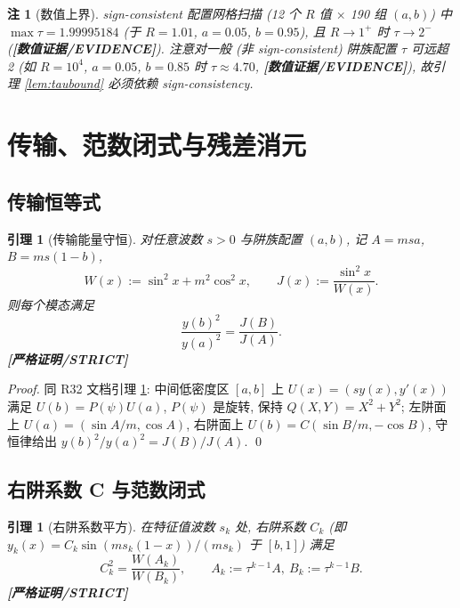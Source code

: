 \documentclass[UTF8]{ctexart}
\newtheorem{lemma}[theorem]{引理}
\newtheorem{remark}[theorem]{注}
\newcommand{\STRICT}{\textbf{[严格证明/STRICT]}}
\newcommand{\EVID}{\textbf{[数值证据/EVIDENCE]}}
\begin{document}
\begin{remark}[数值上界]\label{rem:taunum}
	sign-consistent 配置网格扫描 (12 个 $R$ 值 $\times$ 190 组 $(a,b)$) 中
	$\max\tau=1.99995184$ (于 $R=1.01$, $a=0.05$, $b=0.95$), 且 $R\to1^+$ 时
	$\tau\to2^-$ (\EVID). 注意对一般 (非 sign-consistent) 阱族配置 $\tau$ 可远超 2
	(如 $R=10^4$, $a=0.05$, $b=0.85$ 时 $\tau\approx4.70$, \EVID), 故引理
	\ref{lem:taubound} 必须依赖 sign-consistency.
\end{remark}

\section{传输、范数闭式与残差消元}\label{sec:elim}

\subsection{传输恒等式}

\begin{lemma}[传输能量守恒]\label{lem:energy}
	对任意波数 $s>0$ 与阱族配置 $(a,b)$, 记 $A=msa$, $B=ms(1-b)$,
	\begin{equation}
		W(x):=\sin^2x+m^2\cos^2x,\qquad
		J(x):=\frac{\sin^2x}{W(x)}.
	\end{equation}
	则每个模态满足
	\begin{equation}
		\frac{y(b)^2}{y(a)^2}=\frac{J(B)}{J(A)}.
		\label{eq:ratio}
	\end{equation}
	\STRICT{}
\end{lemma}

\begin{proof}
	同 R32 文档引理 \ref*{lem:energy}: 中间低密度区 $[a,b]$ 上 $U(x)=(sy(x),y'(x))$
	满足 $U(b)=P(\psi)U(a)$, $P(\psi)$ 是旋转, 保持 $Q(X,Y)=X^2+Y^2$; 左阱面上
	$U(a)=(\sin A/m,\cos A)$, 右阱面上 $U(b)=C(\sin B/m,-\cos B)$, 守恒律给出
	$y(b)^2/y(a)^2=J(B)/J(A)$. \qed
\end{proof}

\subsection{右阱系数 C 与范数闭式}

\begin{lemma}[右阱系数平方]\label{lem:C}
	在特征值波数 $s_k$ 处, 右阱系数 $C_k$ (即 $y_k(x)=C_k\sin(ms_k(1-x))/(ms_k)$ 于
	$[b,1]$) 满足
	\begin{equation}
		C_k^2=\frac{W(A_k)}{W(B_k)},\qquad
		A_k:=\tau^{k-1}A,\ B_k:=\tau^{k-1}B.
		\label{eq:C}
	\end{equation}
	\STRICT{}
\end{lemma}
\end{document}
